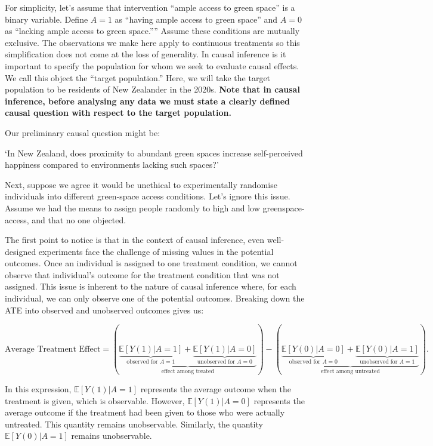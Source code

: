 \documentclass[
  singlecolumn]{article}
\begin{document}
For simplicity, let's assume that intervention ``ample access to green
space'' is a binary variable. Define \(A = 1\) as ``having ample access
to green space'' and \(A = 0\) as ``lacking ample access to green
space.'''' Assume these conditions are mutually exclusive. The
observations we make here apply to continuous treatments so this
simplification does not come at the loss of generality. In causal
inference is it important to specify the population for whom we seek to
evaluate causal effects. We call this object the ``target population.''
Here, we will take the target population to be residents of New
Zealander in the 2020s. \textbf{Note that in causal inference, before
analysing any data we must state a clearly defined causal question with
respect to the target population.}

Our preliminary causal question might be:

`In New Zealand, does proximity to abundant green spaces increase
self-perceived happiness compared to environments lacking such spaces?'

Next, suppose we agree it would be unethical to experimentally randomise
individuals into different green-space access conditions. Let's ignore
this issue. Assume we had the means to assign people randomly to high
and low greenspace-access, and that no one objected.

The first point to notice is that in the context of causal inference,
even well-designed experiments face the challenge of missing values in
the potential outcomes. Once an individual is assigned to one treatment
condition, we cannot observe that individual's outcome for the treatment
condition that was not assigned. This issue is inherent to the nature of
causal inference where, for each individual, we can only observe one of
the potential outcomes. Breaking down the ATE into observed and
unobserved outcomes gives us:

\[
\text{Average Treatment Effect} = \left(\underbrace{\underbrace{\mathbb{E}[Y(1)|A = 1]}_{\text{observed for } A = 1} + \underbrace{\mathbb{E}[Y(1)|A = 0]}_{\text{unobserved for } A = 0}}_{\text{effect among treated}}\right) - \left(\underbrace{\underbrace{\mathbb{E}[Y(0)|A = 0]}_{\text{observed for } A = 0} + \underbrace{\mathbb{E}[Y(0)|A = 1]}_{\text{unobserved for } A = 1}}_{\text{effect among untreated}}\right).
\]

In this expression, \(\mathbb{E}[Y(1)|A = 1]\) represents the average
outcome when the treatment is given, which is observable. However,
\(\mathbb{E}[Y(1)|A = 0]\) represents the average outcome if the
treatment had been given to those who were actually untreated. This
quantity remains unobservable. Similarly, the quantity
\(\mathbb{E}[Y(0)|A = 1]\) remains unobservable.
\end{document}
